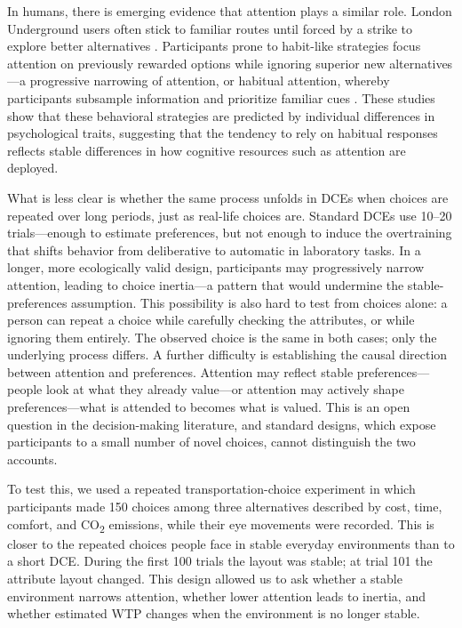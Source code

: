 In humans, there is emerging evidence that attention plays a similar role. London Underground users often stick to familiar routes until forced by a strike to explore better alternatives \cite{larcom2017}. Participants prone to habit-like strategies focus attention on previously rewarded options while ignoring superior new alternatives---a progressive narrowing of attention, or habitual attention, whereby participants subsample information and prioritize familiar cues \cite{henriquezJara2025}. These studies show that these behavioral strategies are predicted by individual differences in psychological traits, suggesting that the tendency to rely on habitual responses reflects stable differences in how cognitive resources such as attention are deployed.

What is less clear is whether the same process unfolds in DCEs when choices are repeated over long periods, just as real-life choices are. Standard DCEs use 10--20 trials---enough to estimate preferences, but not enough to induce the overtraining that shifts behavior from deliberative to automatic in laboratory tasks. In a longer, more ecologically valid design, participants may progressively narrow attention, leading to choice inertia---a pattern that would undermine the stable-preferences assumption. This possibility is also hard to test from choices alone: a person can repeat a choice while carefully checking the attributes, or while ignoring them entirely. The observed choice is the same in both cases; only the underlying process differs. A further difficulty is establishing the causal direction between attention and preferences. Attention may reflect stable preferences---people look at what they already value---or attention may actively shape preferences---what is attended to becomes what is valued. This is an open question in the decision-making literature, and standard designs, which expose participants to a small number of novel choices, cannot distinguish the two accounts.

To test this, we used a repeated transportation-choice experiment in which participants made 150 choices among three alternatives described by cost, time, comfort, and CO\textsubscript{2} emissions, while their eye movements were recorded. This is closer to the repeated choices people face in stable everyday environments than to a short DCE. During the first 100 trials the layout was stable; at trial 101 the attribute layout changed. This design allowed us to ask whether a stable environment narrows attention, whether lower attention leads to inertia, and whether estimated WTP changes when the environment is no longer stable.

